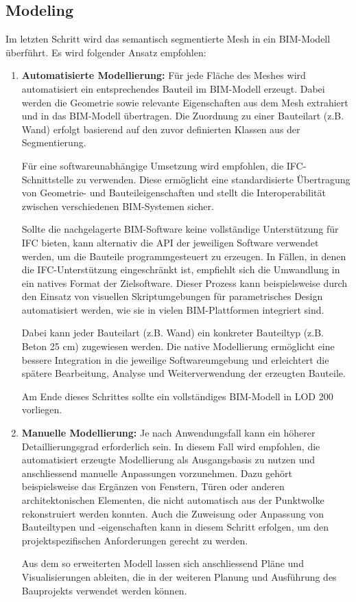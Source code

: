 \subsection{Modeling}
\begin{German}
    Im letzten Schritt wird das semantisch segmentierte Mesh in ein BIM-Modell überführt. Es wird folgender Ansatz empfohlen:
    
    \begin{enumerate}
        \item \textbf{Automatisierte Modellierung:} Für jede Fläche des Meshes wird automatisiert ein entsprechendes Bauteil im BIM-Modell erzeugt. Dabei werden die Geometrie sowie relevante Eigenschaften aus dem Mesh extrahiert und in das BIM-Modell übertragen. Die Zuordnung zu einer Bauteilart (z.B. Wand) erfolgt basierend auf den zuvor definierten Klassen aus der Segmentierung.

        Für eine softwareunabhängige Umsetzung wird empfohlen, die IFC-Schnittstelle zu verwenden. Diese ermöglicht eine standardisierte Übertragung von Geometrie- und Bauteileigenschaften und stellt die Interoperabilität zwischen verschiedenen BIM-Systemen sicher.

        Sollte die nachgelagerte BIM-Software keine vollständige Unterstützung für IFC bieten, kann alternativ die API der jeweiligen Software verwendet werden, um die Bauteile programmgesteuert zu erzeugen. In Fällen, in denen die IFC-Unterstützung eingeschränkt ist, empfiehlt sich die Umwandlung in ein natives Format der Zielsoftware. Dieser Prozess kann beispielsweise durch den Einsatz von visuellen Skriptumgebungen für parametrisches Design automatisiert werden, wie sie in vielen BIM-Plattformen integriert sind. 
        
        Dabei kann jeder Bauteilart (z.B. Wand) ein konkreter Bauteiltyp (z.B. Beton 25 cm) zugewiesen werden. Die native Modellierung ermöglicht eine bessere Integration in die jeweilige Softwareumgebung und erleichtert die spätere Bearbeitung, Analyse und Weiterverwendung der erzeugten Bauteile.

        Am Ende dieses Schrittes sollte ein vollständiges BIM-Modell in LOD 200 vorliegen.

        \item \textbf{Manuelle Modellierung:} Je nach Anwendungsfall kann ein höherer Detaillierungsgrad erforderlich sein. In diesem Fall wird empfohlen, die automatisiert erzeugte Modellierung als Ausgangsbasis zu nutzen und anschliessend manuelle Anpassungen vorzunehmen. Dazu gehört beispielsweise das Ergänzen von Fenstern, Türen oder anderen architektonischen Elementen, die nicht automatisch aus der Punktwolke rekonstruiert werden konnten. Auch die Zuweisung oder Anpassung von Bauteiltypen und -eigenschaften kann in diesem Schritt erfolgen, um den projektspezifischen Anforderungen gerecht zu werden.

        Aus dem so erweiterten Modell lassen sich anschliessend Pläne und Visualisierungen ableiten, die in der weiteren Planung und Ausführung des Bauprojekts verwendet werden können.
    \end{enumerate}
\end{German}

